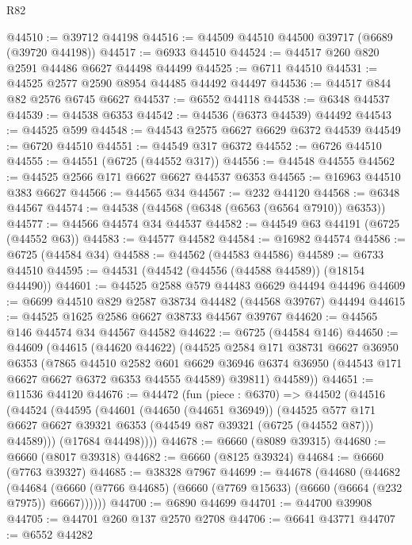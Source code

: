 \begin{lexlean}{R82}
\begin{coremodule}
@44510 := @39712 @44198
@44516 := @44509 @44510 @44500 @39717 (@6689 (@39720 @44198))
@44517 := @6933 @44510
@44524 := @44517 @260 @820 @2591 @44486 @6627 @44498 @44499
@44525 := @6711 @44510
@44531 := @44525 @2577 @2590 @8954 @44485 @44492 @44497
@44536 := @44517 @844 @82 @2576 @6745 @6627
@44537 := @6552 @44118
@44538 := @6348 @44537
@44539 := @44538 @6353
@44542 := @44536 (@6373 @44539) @44492
@44543 := @44525 @599
@44548 := @44543 @2575 @6627 @6629 @6372 @44539
@44549 := @6720 @44510
@44551 := @44549 @317 @6372
@44552 := @6726 @44510
@44555 := @44551 (@6725 (@44552 @317))
@44556 := @44548 @44555
@44562 := @44525 @2566 @171 @6627 @6627 @44537 @6353
@44565 := @16963 @44510 @383 @6627
@44566 := @44565 @34
@44567 := @232 @44120
@44568 := @6348 @44567
@44574 := @44538 (@44568 (@6348 (@6563 (@6564 @7910)) @6353))
@44577 := @44566 @44574 @34 @44537
@44582 := @44549 @63 @44191 (@6725 (@44552 @63))
@44583 := @44577 @44582
@44584 := @16982 @44574
@44586 := @6725 (@44584 @34)
@44588 := @44562 (@44583 @44586)
@44589 := @6733 @44510
@44595 := @44531 (@44542 (@44556 (@44588 @44589)) (@18154 @44490))
@44601 := @44525 @2588 @579 @44483 @6629 @44494 @44496
@44609 := @6699 @44510 @829 @2587 @38734 @44482 (@44568 @39767) @44494
@44615 := @44525 @1625 @2586 @6627 @38733 @44567 @39767
@44620 := @44565 @146 @44574 @34 @44567 @44582
@44622 := @6725 (@44584 @146)
@44650 := @44609
    (@44615
      (@44620 @44622)
      (@44525
        @2584
        @171
        @38731
        @6627
        @36950
        @6353
        (@7865
          @44510
          @2582
          @601
          @6629
          @36946
          @6374
          @36950
          (@44543 @171 @6627 @6627 @6372 @6353 @44555 @44589)
          @39811)
        @44589))
@44651 := @11536 @44120
@44676 := @44472
    (fun (piece : @6370) =>
    @44502
      (@44516
        (@44524
          (@44595
            (@44601
              (@44650 (@44651 @36949))
              (@44525
                @577
                @171
                @6627
                @6627
                @39321
                @6353
                (@44549 @87 @39321 (@6725 (@44552 @87)))
                @44589)))
          (@17684 @44498))))
@44678 := @6660 (@8089 @39315)
@44680 := @6660 (@8017 @39318)
@44682 := @6660 (@8125 @39324)
@44684 := @6660 (@7763 @39327)
@44685 := @38328 @7967
@44699 := @44678
    (@44680
      (@44682
        (@44684 (@6660 (@7766 @44685) (@6660 (@7769 @15633) (@6660 (@6664 (@232 @7975)) @6667))))))
@44700 := @6890 @44699
@44701 := @44700 @39908
@44705 := @44701 @260 @137 @2570 @2708
@44706 := @6641 @43771
@44707 := @6552 @44282

\end{coremodule}
\end{lexlean}
